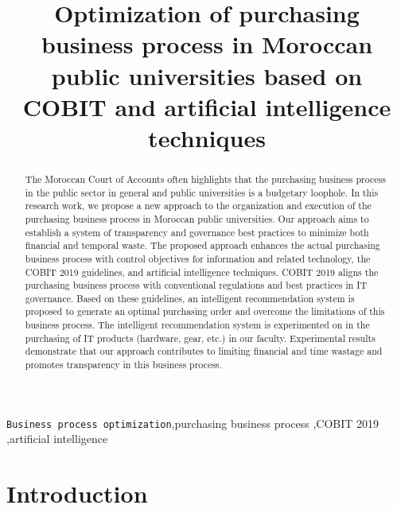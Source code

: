 \documentclass[preprint,3p,onecolumn]{elsarticle}
\begin{document}
\begin{frontmatter}

\title{Optimization of purchasing business process in Moroccan public universities based on COBIT and artificial intelligence techniques}


\begin{abstract}
The Moroccan Court of Accounts often highlights that the purchasing business process in the public sector in general and public universities is a budgetary loophole. In this research work, we propose a new approach to the organization and execution of the purchasing business process in Moroccan public universities. Our approach aims to establish a system of transparency and governance best practices to minimize both financial and temporal waste. The proposed approach enhances the actual purchasing business process with control objectives for information and related technology, the COBIT 2019 guidelines, and artificial intelligence techniques. COBIT 2019 aligns the purchasing business process with conventional regulations and best practices in IT governance. Based on these guidelines, an intelligent recommendation system is proposed to generate an optimal purchasing order and overcome the limitations of this business process. The intelligent recommendation system is experimented on in the purchasing of IT products (hardware, gear, etc.) in our faculty. Experimental results demonstrate that our approach contributes to limiting financial and time wastage and promotes transparency in this business process.
\end{abstract}

\begin{keyword}
\texttt{Business process optimization}\sep purchasing business process \sep COBIT 2019 \sep artificial intelligence
\end{keyword}

\end{frontmatter}

\section{Introduction}
\end{document}
